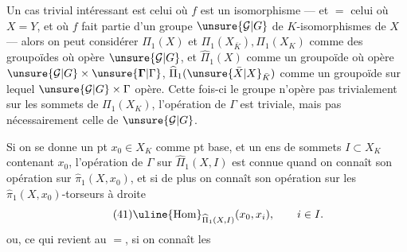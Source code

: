 Un cas trivial intéressant est celui où $f$ est un isomorphisme --- et $=$ celui où $X=Y$, et où $f$ fait partie d'un groupe $\unsure{\mathcal G|G}$ de $K$-isomorphismes de $X$ --- alors on peut considérer $\Pi_1(X)$ et $\Pi_1(X_{\bar K}),\Pi_1(X_K)$ comme des groupoïdes où opère $\unsure{\mathcal G|G}$, et $\widehat\Pi_1(X)$ comme un groupoïde où opère $\unsure{\mathcal G|G}\times\unsure{\mathbf{\Gamma}|\Gamma}$, $\widehat\Pi_1(\unsure{\bar X|X}_{\bar K})$ comme un groupoïde sur lequel $\unsure{\mathcal G|G}\times\Gamma$ opère. Cette fois-ci le groupe n'opère pas trivialement sur les sommets de $\Pi_1(X_K)$, l'opération de $\Gamma$ est triviale, mais pas nécessairement celle de $\unsure{\mathcal G|G}$.

Si on se donne un pt $x_0\in X_K$ comme pt base, et un ens de sommets $I\subset X_K$ contenant $x_0$, l'opération de $\Gamma$ sur $\widehat\Pi_1(X,I)$ est connue quand on connaît son opération sur $\widehat\pi_1(X,x_0)$, et si de plus on connaît son opération sur les $\widehat\pi_1(X,x_0)$-torseurs à droite
\[
\tag{41}\uline{\operatorname{Hom}}_{\widehat\Pi_1(X,I)}(x_0,x_i),\qquad i\in I.
\]
ou, ce qui revient au $=$, si on connaît les
